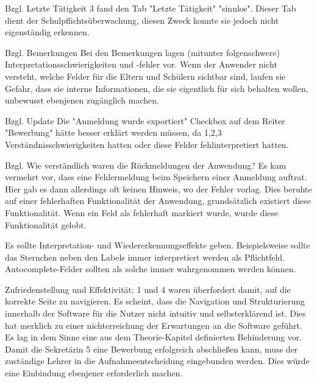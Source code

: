 Bzgl. Letzte Tätigkeit
3 fand den Tab "Letzte Tätigkeit" "sinnlos". Dieser Tab dient der Schulpflichtsüberwachung, diesen Zweck konnte sie jedoch nicht eigenständig erkennen.

Bzgl. Bemerkungen
Bei den Bemerkungen lagen (mitunter folgenschwere) Interpretationsschwierigkeiten und -fehler vor. Wenn der Anwender nicht versteht, welche Felder für die Eltern und Schülern sichtbar sind, laufen sie Gefahr, dass sie interne Informationen, die sie eigentlich für sich behalten wollen, unbewusst ebenjenen zugänglich machen. 

Bzgl. Update
Die "Anmeldung wurde exportiert" Checkbox auf dem Reiter "Bewerbung" hätte besser erklärt werden müssen, da 1,2,3 Verständnisschwierigkeiten hatten oder diese Felder fehlinterpretiert hatten.

Bzgl. Wie verständlich waren die Rückmeldungen der Anwendung?
Es kam vermehrt vor, dass eine Fehlermeldung beim Speichern einer Anmeldung auftrat. Hier gab es dann allerdings oft keinen Hinweis, wo der Fehler vorlag. Dies beruhte auf einer fehlerhaften Funktionalität der Anwendung, grundsätzlich existiert diese Funktionalität. Wenn ein Feld als fehlerhaft markiert wurde, wurde diese Funktionalität gelobt.

Es sollte Interpretation- und Wiedererkennungseffekte geben. Beispielsweise sollte das Sternchen neben den Labels immer interpretiert werden als Pflichtfeld. Autocomplete-Felder sollten als solche immer wahrgenommen werden können.

Zufriedenstellung und Effektivität:
1 und 4 waren überfordert damit, auf die korrekte Seite zu navigieren. Es scheint, dass die Navigation und Strukturierung innerhalb der Software für die Nutzer nicht intuitiv und selbsterklärend ist. Dies hat merklich zu einer nichterreichung der Erwartungen an die Software geführt. Es lag in dem Sinne eine aus dem Theorie-Kapitel definierten Behinderung vor. 
Damit die Sekretärin 5 eine Bewerbung erfolgreich abschließen kann, muss der zuständige Lehrer in die Aufnahmeentscheidung eingebunden werden. Dies würde eine Einbindung ebenjener erforderlich machen.

